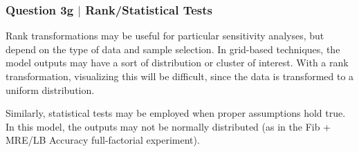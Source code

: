 \documentclass[aspectratio=1610]{beamer}
\begin{document}
\begin{frame}
\frametitle{Question 3g $|$ Rank/Statistical Tests}

Rank transformations may be useful for particular sensitivity analyses, but depend on the type of data and sample selection. In grid-based techniques, the model outputs may have a sort of distribution or cluster of interest. With a rank transformation, visualizing this will be difficult, since the data is transformed to a uniform distribution.

\vspace{1em}
Similarly, statistical tests may be employed when proper assumptions hold true. In this model, the outputs may not be normally distributed (as in the Fib + MRE/LB Accuracy full-factorial experiment). 
\end{frame}
\end{document}

